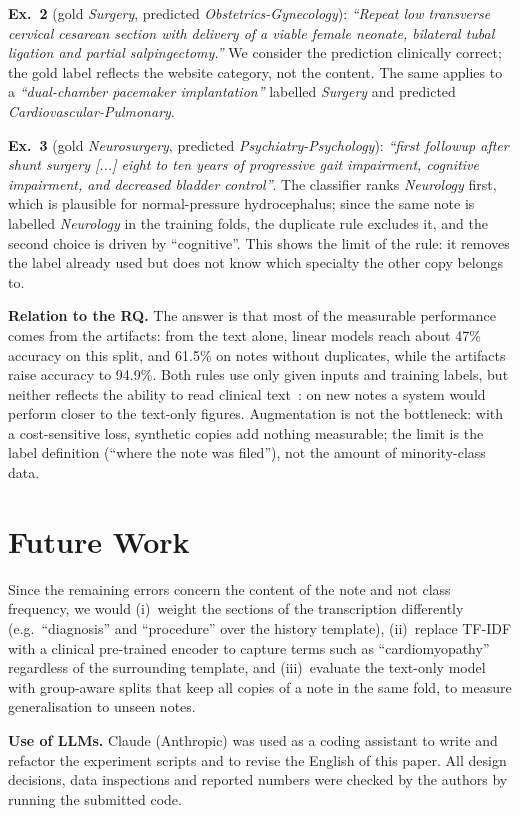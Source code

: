 \documentclass[twocolumn,10pt]{article}
\newcommand{\tfidf}{TF-IDF\xspace}
\newcommand{\spec}[1]{\textit{#1}}
\begin{document}
\textbf{Ex.~2} (gold \spec{Surgery}, predicted \spec{Obstetrics-Gynecology}): \emph{``Repeat low transverse cervical cesarean section with delivery of a viable female neonate, bilateral tubal ligation and partial salpingectomy.''} We consider the prediction clinically correct; the gold label reflects the website category, not the content. The same applies to a \emph{``dual-chamber pacemaker implantation''} labelled \spec{Surgery} and predicted \spec{Cardiovascular-Pulmonary}.

\textbf{Ex.~3} (gold \spec{Neurosurgery}, predicted \spec{Psychiatry-Psychology}): \emph{``first followup after shunt surgery [...] eight to ten years of progressive gait impairment, cognitive impairment, and decreased bladder control''}. The classifier ranks \spec{Neurology} first, which is plausible for normal-pressure hydrocephalus; since the same note is labelled \spec{Neurology} in the training folds, the duplicate rule excludes it, and the second choice is driven by ``cognitive''. This shows the limit of the rule: it removes the label already used but does not know which specialty the other copy belongs to.

\textbf{Relation to the RQ.} The answer is that most of the measurable performance comes from the artifacts: from the text alone, linear models reach about 47\% accuracy on this split, and 61.5\% on notes without duplicates, while the artifacts raise accuracy to 94.9\%. Both rules use only given inputs and training labels, but neither reflects the ability to read clinical text~\cite{kaufman2012leakage}: on new notes a system would perform closer to the text-only figures. Augmentation is not the bottleneck: with a cost-sensitive loss, synthetic copies add nothing measurable; the limit is the label definition (``where the note was filed''), not the amount of minority-class data.

\section{Future Work}

Since the remaining errors concern the content of the note and not class frequency, we would (i)~weight the sections of the transcription differently (e.g.\ ``diagnosis'' and ``procedure'' over the history template), (ii)~replace \tfidf with a clinical pre-trained encoder to capture terms such as ``cardiomyopathy'' regardless of the surrounding template, and (iii)~evaluate the text-only model with group-aware splits that keep all copies of a note in the same fold, to measure generalisation to unseen notes.

\renewcommand{\refname}{Bibliography}



\noindent\textbf{Use of LLMs.} Claude (Anthropic) was used as a coding assistant to write and refactor the experiment scripts and to revise the English of this paper. All design decisions, data inspections and reported numbers were checked by the authors by running the submitted code.
\end{document}
